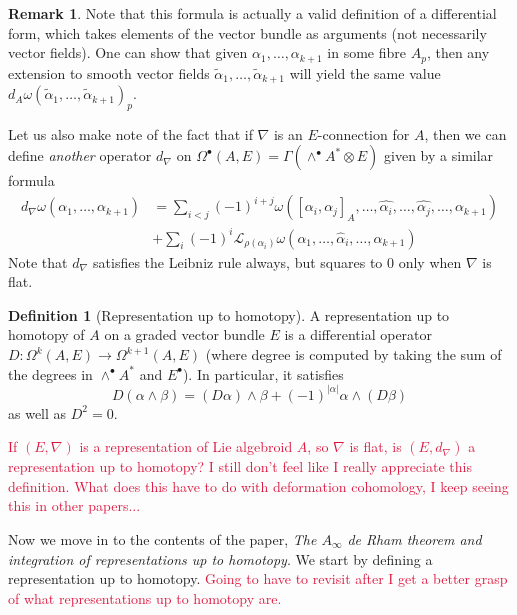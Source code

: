 \documentclass[aps,pra,showpacs,notitlepage,onecolumn,superscriptaddress,nofootinbib]{revtex4-1}
\newcommand{\pop}[1]{\textcolor{crimson}{#1}}
\theoremstyle{definition}
\newtheorem{definition}{Definition}[section]
\newtheorem{remark}{Remark}[section]
\begin{document}
\begin{remark}
Note that this formula is actually a valid definition of a differential form, which takes elements of the vector bundle as arguments (not necessarily vector fields). One can 
show that given $\alpha_1, \dots, \alpha_{k + 1}$ in some fibre $A_p$, then any extension to smooth vector fields $\widetilde{\alpha}_1, \dots, \widetilde{\alpha}_{k + 1}$ will yield the same value $d_A \omega(\widetilde{\alpha}_1, \dots, \widetilde{\alpha}_{k + 1})_p$.
\end{remark}

Let us also make note of the fact that if $\nabla$ is an $E$-connection for $A$, then we can define \emph{another} operator $d_{\nabla}$ on $\Omega^{\bullet}(A, E) = \Gamma(\wedge^{\bullet} A^{*} \otimes E)$ given 
by a similar formula
\begin{align}
    d_{\nabla} \omega(\alpha_1, \dots, \alpha_{k + 1}) &= \sum_{i < j} (-1)^{i + j} \omega([\alpha_i, \alpha_j]_A, \dots, \widehat{\alpha_i}, \dots, \widehat{\alpha_j}, \dots, \alpha_{k + 1}) 
    \\ &+ \sum_{i} (-1)^{i} \mathcal{L}_{\rho(\alpha_i)} \omega(\alpha_1, \dots, \widehat{\alpha}_i, \dots, \alpha_{k + 1})
\end{align}
Note that $d_{\nabla}$ satisfies the Leibniz rule always, but squares to $0$ only when $\nabla$ is flat.

\begin{definition}[Representation up to homotopy]
    A representation up to homotopy of $A$ on a graded vector bundle $E$ is a differential operator $D : \Omega^{k}(A, E) \rightarrow \Omega^{k + 1}(A, E)$ (where degree is computed by taking the sum 
    of the degrees in $\wedge^{\bullet} A^{*}$ and $E^{\bullet}$). In particular, 
    it satisfies
    \begin{equation}
        D(\alpha \wedge \beta) = (D\alpha) \wedge \beta + (-1)^{|\alpha|} \alpha \wedge (D\beta)
    \end{equation}
    as well as $D^2 = 0$.
\end{definition}

\noindent \pop{If $(E, \nabla)$ is a representation of Lie algebroid $A$, so $\nabla$ is flat, is $(E, d_{\nabla})$ a representation up to homotopy? I still don't feel like I really appreciate this definition. 
What does this have to do with deformation cohomology, I keep seeing this in other papers...}

\noindent Now we move in to the contents of the paper, \emph{The $A_{\infty}$ de Rham theorem and integration of representations up to homotopy}. We start by 
defining a representation up to homotopy. \pop{Going to have to revisit after I get a better grasp of what representations up to homotopy are.}
\end{document}
